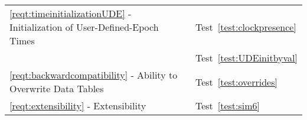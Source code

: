 \begin{longtable}[c]{||p{3in}|p{3in}|}
\ref{reqt:timeinitializationUDE} - Initialization of User-Defined-Epoch Times 
 &Test~\ref{test:clockpresence} \\  
 &Test~\ref{test:UDEinitbyval} \\  
  \hline

\ref{reqt:backwardcompatibility} - Ability to Overwrite Data Tables  
 &Test~\ref{test:overrides} \\  
  \hline

\ref{reqt:extensibility} -  Extensibility
 &Test~\ref{test:sim6} \\  
\hline

\end{longtable}
